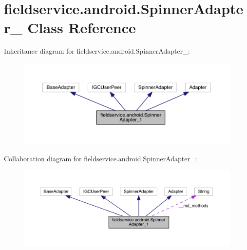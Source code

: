 \hypertarget{classfieldservice_1_1android_1_1_spinner_adapter__1}{\section{fieldservice.\+android.\+Spinner\+Adapter\+\_ Class Reference}
\label{classfieldservice_1_1android_1_1_spinner_adapter__1}
}


Inheritance diagram for fieldservice.\+android.\+Spinner\+Adapter\+\_\+:
\nopagebreak
\begin{figure}[H]
\begin{center}
\leavevmode
\includegraphics[width=350pt]{classfieldservice_1_1android_1_1_spinner_adapter__1__inherit__graph}
\end{center}
\end{figure}


Collaboration diagram for fieldservice.\+android.\+Spinner\+Adapter\+\_\+:
\nopagebreak
\begin{figure}[H]
\begin{center}
\leavevmode
\includegraphics[width=350pt]{classfieldservice_1_1android_1_1_spinner_adapter__1__coll__graph}
\end{center}
\end{figure}
